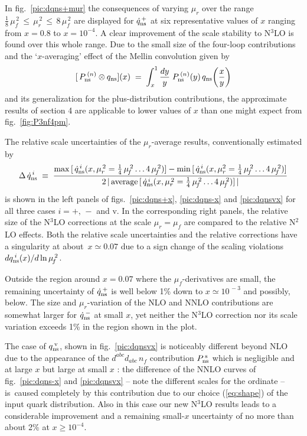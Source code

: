 \documentclass[12pt]{article}
\newcommand{\beq}{\begin{equation}}
\newcommand{\eeq}{\end{equation}}
\def\nf{{n^{}_{\! f}}}
\begin{document}
In fig.~\ref{pic:dqns+mur} the consequences of varying $\mu_r$ over the range
$\frac{1}{8}\,\mu_{\!f}^{\,2} \,\leq\, \mu_r^{\,2} \,\leq\, 8 \,\mu_{\!f}^{\,2}$ are 
displayed for $\dot{q}_{\rm ns}^{\, +}$ at six representative values of $x$ 
ranging from $x = 0.8$ to $x = 10^{-4}$. 
A clear improvement of the scale stability to N$^3$LO is found over this whole 
range. Due to the small size of the four-loop contributions and the 
`$x$-averaging' effect of the Mellin convolution given by
%
\beq
\label{eq:Mconv}
  [ \,P_{\rm ns}^{\:(n)} \otimes q_{\rm ns} ](x) \;=\;
  \int_x^1  \frac{dy}{y} \; P_{\rm ns}^{\:(n)} (y)\,
  q_{\rm ns}\bigg(\frac{x}{y}\bigg) 
\eeq
%
and its generalization for the plus-distribution contributions, the approximate
results of section 4 are applicable to lower values of $x$ than one might 
expect from fig.~\ref{fig:P3nf4pm}.

The relative scale uncertainties of the $\mu_r^{}$-average results, 
conventionally estimated by
%
\beq
\label{eq:screl}
 \Delta \,\dot{q}_{\rm ns}^{\, i} \; \equiv \;
 \frac{\max\, [ \,\dot{q}_{\rm ns}^{\, i}(x,\mu_r^{\,2} = \frac{1}{4}\,
 \mu_{\!f}^{\,2} \ldots 4\,\mu_{\!f}^{\,2})] - \min\, [ \,\dot{q}_{\rm ns}^{\, i} (x,
 \mu_r^2 = \frac{1}{4}\,\mu_{\!f}^{\,2} \ldots 4 \,\mu_{\!f}^{\,2})] }
 { 2\, |\, {\rm average}\, [ \,\dot{q}_{\rm ns}^{\, i}(x, \mu_r^{\,2} =
 \frac{1}{4}\,\mu_{\!f}^{\,2} \ldots 4 \,\mu_{\!f}^{\,2})]\, | }
\eeq
%
is shown in the left panels of figs.~\ref{pic:dqns+x}, \ref{pic:dqns-x} and
\ref{pic:dqnsvx} for all three cases $i = +,\,-$ and v. In the corresponding
right panels, the relative size of the N$^3$LO corrections at the scale
$\mu_r = \mu_{\!f}^{}$ are compared to the relative N$^2$LO effects. Both the
relative scale uncertainties and the relative corrections have a singularity
at about $\,x \simeq 0.07$ due to a sign change of the scaling violations 
$dq_{\rm ns}^{\:i}(x)/ d\ln \mu_{\!f}^{\,2}$.

Outside the region around $x=0.07$ where the $\mu_{\!f}^{}$-derivatives are
small, the remaining uncertainty of $\dot{q}_{\rm ns}^{\: +}$ is well below
1\% down to $x \simeq 10^{\,-3}$ and possibly, below. 
The size and $\mu_r$-variation of the NLO and NNLO contributions are somewhat 
larger for $\dot{q}_{\rm ns}^{\: -}$ at small $x$, yet neither the N$^3$LO 
correction nor its scale variation exceeds 1\% in the region shown in the plot. 

The case of $q_{\rm ns}^{\:\rm v}$, shown in fig.~\ref{pic:dqnsvx} is 
noticeably different beyond NLO due to the appearance of the 
$d^{abc}d_{abc} \,\nf$ contribution $P_{\rm ns}^{\:\rm s}$ which is negligible
and at large $x$ but large at small $x$ \cite{Moch:2004pa}: 
the difference of the NNLO curves of fig.~\ref{pic:dqns-x} and \ref{pic:dqnsvx}
-- note the different scales for the ordinate -- is~caused completely by this 
contribution due to our choice (\ref{eq:shape}) of the input quark distribution.
Also in this case our new N$^3$LO results leads to a considerable improvement 
and a remaining small-$x$ uncertainty of no more than about 2\% at 
$x \geq 10^{-4}$.
\end{document}
